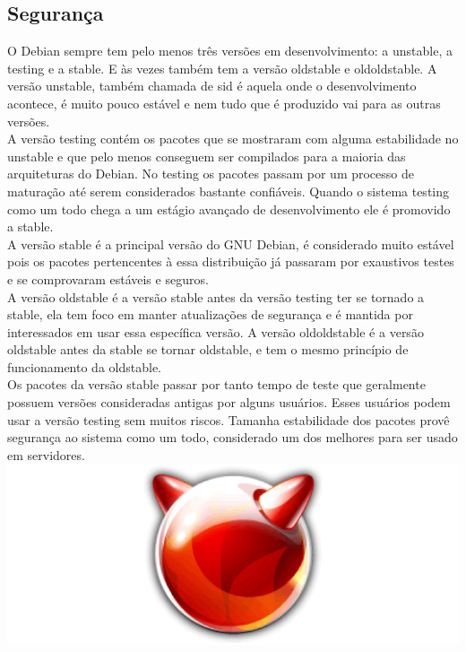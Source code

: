\documentclass[conference]{IEEEtran}
\begin{document}
\subsection{Segurança}\label{sec:LinuxSec}
O Debian sempre tem pelo menos três versões em desenvolvimento: a unstable, a testing e a stable. E às vezes também tem a versão oldstable e oldoldstable. A versão unstable, também chamada de sid é aquela onde o desenvolvimento acontece, é muito pouco estável e nem tudo que é produzido vai para as outras versões.\\

A versão testing contém os pacotes que se mostraram com alguma estabilidade no unstable e que pelo menos conseguem ser compilados para a maioria das arquiteturas do Debian. No testing os pacotes passam por um processo de maturação até serem considerados bastante confiáveis. Quando o sistema testing como um todo chega a um estágio avançado de desenvolvimento ele é promovido a stable.\\

A versão stable é a principal versão do GNU Debian, é considerado muito estável pois os pacotes pertencentes à essa distribuição já passaram por exaustivos testes e se comprovaram estáveis e seguros.\\

A versão oldstable é a versão stable antes da versão testing ter se tornado a stable, ela tem foco em manter atualizações de segurança e é mantida por interessados em usar essa específica versão. A versão oldoldstable é a versão oldstable antes da stable se tornar oldstable, e tem o mesmo princípio de funcionamento da oldstable.\\

Os pacotes da versão stable passar por tanto tempo de teste que geralmente possuem versões consideradas antigas por alguns usuários. Esses usuários podem usar a versão testing sem muitos riscos. Tamanha estabilidade dos pacotes provê segurança ao sistema como um todo, considerado um dos melhores para ser usado em servidores\cite{DebianVersions}.\\


\includegraphics[scale = 0.2]{FreeBSD.png}\\
\end{document}
